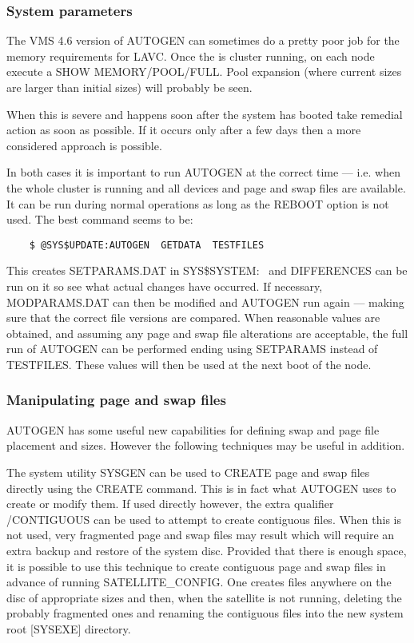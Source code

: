 \subsubsection {System parameters}

The VMS 4.6 version of AUTOGEN can sometimes do a pretty poor job for the memory
requirements for LAVC.
Once the is cluster running, on each node execute a SHOW MEMORY/POOL/FULL.
Pool expansion (where current sizes are larger than initial sizes) will
probably be seen.

When this is severe and happens soon after the system has booted take remedial
action as soon as possible.
If it occurs only after a few days then a more considered approach is possible.

In both cases it is important to run AUTOGEN at the correct time --- i.e. 
when the whole cluster is running and all devices and page and swap files
are available.
It can be run during normal operations as long as the REBOOT option is not used.
The best command seems to be:
\begin{verbatim}
    $ @SYS$UPDATE:AUTOGEN  GETDATA  TESTFILES
\end{verbatim}
This creates SETPARAMS.DAT in SYS\$SYSTEM:~ and DIFFERENCES can be run on it
so see what actual changes have occurred.
If necessary, MODPARAMS.DAT can then be modified and  AUTOGEN run again ---
making sure that the correct file versions are compared.
When reasonable values are obtained, and assuming any page and swap file
alterations are acceptable, the full run of AUTOGEN can be performed ending
using SETPARAMS instead of TESTFILES.
These values will then be used at the next boot of the node.

\subsubsection {Manipulating page and swap files}
\label{manip_ps}

AUTOGEN has some useful new capabilities for defining swap and page file
placement and sizes.
However the following techniques may be useful in addition.

The system utility SYSGEN can be used to CREATE page and swap files directly
using the CREATE command.
This is in fact what AUTOGEN uses to create or modify them.
If used directly however, the extra qualifier /CONTIGUOUS can be used to
attempt to create contiguous files.
When this is not used, very fragmented page and swap files may result which
will require an extra backup and restore of the system disc.
Provided that there is enough space, it is possible to use this technique to
create contiguous page and swap files in advance of running SATELLITE\_CONFIG.
One creates files anywhere on the disc of appropriate sizes and then, when the
satellite is not running, deleting the probably fragmented ones and renaming
the contiguous files into the new system root [SYSEXE] directory.

